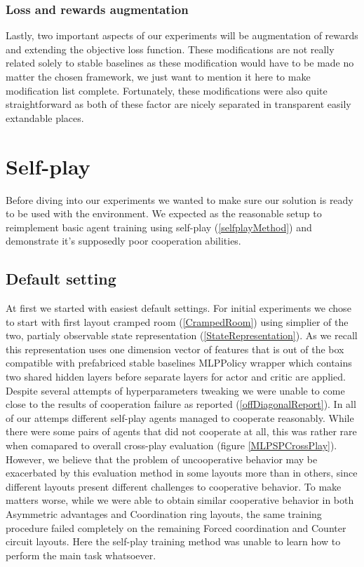 \subsubsection*{Loss and rewards augmentation}
Lastly, two important aspects of our experiments will be augmentation of rewards and extending the objective loss function.
These modifications are not really related solely to stable baselines as these modification would have to be made no matter the chosen framework, we just want to mention it here to make modification list complete. 
Fortunately, these modifications were also quite straightforward as both of these factor are nicely separated in transparent easily extandable places.

\section{Self-play}
Before diving into our experiments we wanted to make sure our solution is ready to be used with the environment.
We expected as the reasonable setup to reimplement basic agent training using self-play (\ref{selfplayMethod}) and demonstrate it's supposedly poor cooperation abilities.

\subsection*{Default setting}
At first we started with easiest default settings.
For initial experiments we chose to start with first layout cramped room (\ref{CrampedRoom}) using simplier of the two, partialy observable state representation (\ref{StateRepresentation}).
As we recall this representation uses one dimension vector of features that is out of the box compatible with prefabriced stable baselines MLPPolicy wrapper which contains two shared hidden layers before separate layers for actor and critic are applied.
Despite several attempts of hyperparameters tweaking we were unable to come close to the results of cooperation failure as reported (\ref{offDiagonalReport}).
In all of our attemps different self-play agents managed to cooperate reasonably.
While there were some pairs of agents that did not cooperate at all, this was rather rare when comapared to overall cross-play evaluation (figure \ref{MLPSPCrossPlay}).
However, we believe that the problem of uncooperative behavior may be exacerbated by this evaluation method in some layouts more than in others, since different layouts present different challenges to cooperative behavior.
To make matters worse, while we were able to obtain similar cooperative behavior in both Asymmetric advantages and Coordination ring layouts, the same training procedure failed completely on the remaining Forced coordination and Counter circuit layouts.
Here the self-play training method was unable to learn how to perform the main task whatsoever.

